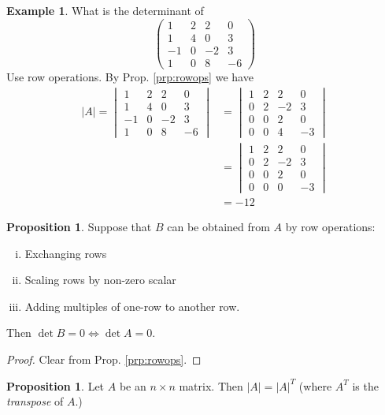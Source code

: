 \documentclass{article}
\theoremstyle{definition} \newtheorem*{definition}{Definition}
\newtheorem{proposition}[theorem]{Proposition}
\newtheorem*{exmp}{Example} \newtheorem*{exmps}{Examples}
\begin{document}
\begin{exmp} What is the determinant of \[ \left(\begin{matrix} 1 & 2 & 2 & 0
    \\ 1 & 4 & 0 & 3 \\ -1 & 0 & -2 & 3 \\ 1 & 0 & 8 & -6 \end{matrix}\right)
\] Use row operations. By Prop. \ref{prp:rowops} we have \begin{align*} |A| =
  \begin{vmatrix} 1 & 2 & 2 & 0 \\ 1 & 4 & 0 & 3 \\ -1 & 0 & -2 & 3 \\ 1 & 0 &
    8 & -6 \end{vmatrix} &= \begin{vmatrix} 1 & 2 & 2 & 0 \\ 0 & 2 & -2 & 3 \\
    0 & 0 & 2 & 0 \\ 0 & 0 & 4 & -3 \end{vmatrix}\\ &= \begin{vmatrix} 1 & 2 &
    2 & 0 \\ 0 & 2 & -2 & 3 \\ 0 & 0 & 2 & 0 \\ 0 & 0 & 0 & -3 \end{vmatrix}\\
  &= -12 \end{align*}

\end{exmp}

\begin{proposition}
  \label{prp:detab} Suppose that $B$ can be obtained from $A$ by row
operations: \begin{enumerate}[(i)] \item Exchanging rows \item Scaling rows by
    non-zero scalar \item Adding multiples of one-row to another row.
  \end{enumerate} Then $\det B = 0 \iff \det A = 0$.  \end{proposition}

\begin{proof} Clear from Prop. \ref{prp:rowops}.  \end{proof}

\begin{proposition} \label{prp:dettran} Let $A$ be an $n\times n$ matrix. Then
  $|A| = |A|^T$  (where $A^T$ is the \emph{transpose} of $A$.)
\end{proposition}
\end{document}
